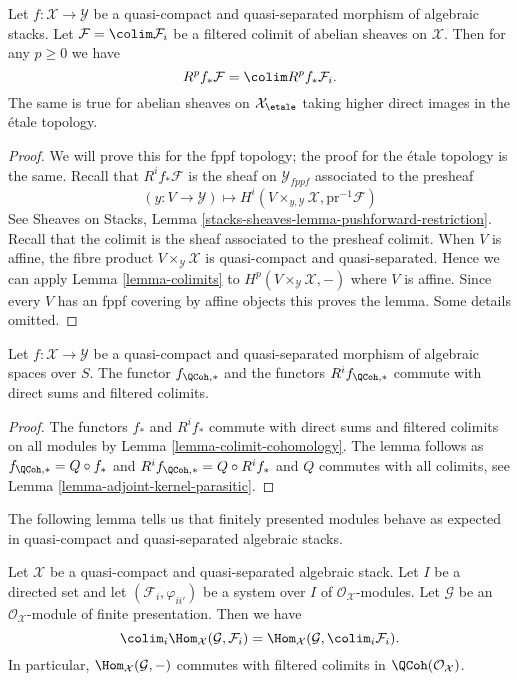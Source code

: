 \begin{lemma}
\label{lemma-colimit-cohomology}
Let $f : \mathcal{X} \to \mathcal{Y}$ be a quasi-compact and quasi-separated
morphism of algebraic stacks. Let $\mathcal{F} = \colim \mathcal{F}_i$
be a filtered colimit of abelian sheaves on $\mathcal{X}$.
Then for any $p \geq 0$ we have
$$
R^pf_*\mathcal{F} = \colim R^pf_*\mathcal{F}_i.
$$
The same is true for abelian sheaves on $\mathcal{X}_\etale$
taking higher direct images in the \'etale topology.
\end{lemma}

\begin{proof}
We will prove this for the fppf topology; the proof for the \'etale
topology is the same. Recall that $R^if_*\mathcal{F}$ is the sheaf on
$\mathcal{Y}_{fppf}$ associated to the presheaf
$$
(y : V \to \mathcal{Y})
\longmapsto
H^i(V \times_{y, \mathcal{Y}} \mathcal{X}, \text{pr}^{-1}\mathcal{F})
$$
See
Sheaves on Stacks, Lemma \ref{stacks-sheaves-lemma-pushforward-restriction}.
Recall that the colimit is the sheaf associated to the presheaf colimit.
When $V$ is affine, the fibre product $V \times_\mathcal{Y} \mathcal{X}$
is quasi-compact and quasi-separated. Hence we can apply
Lemma \ref{lemma-colimits} to $H^p(V \times_\mathcal{Y} \mathcal{X}, -)$
where $V$ is affine. Since every $V$ has an fppf covering by
affine objects this proves the lemma. Some details omitted.
\end{proof}

\begin{lemma}
\label{lemma-quasi-coherent-pushforward-direct-sums}
Let $f : \mathcal{X} \to \mathcal{Y}$ be a quasi-compact and quasi-separated
morphism of algebraic spaces over $S$. The functor $f_{\QCoh, *}$
and the functors $R^if_{\QCoh, *}$ commute with direct sums
and filtered colimits.
\end{lemma}

\begin{proof}
The functors $f_*$ and $R^if_*$ commute with direct sums and filtered
colimits on all modules by Lemma \ref{lemma-colimit-cohomology}.
The lemma follows as $f_{\QCoh, *} = Q \circ f_*$ and
$R^if_{\QCoh, *} = Q \circ R^if_*$ and $Q$ commutes with
all colimits, see Lemma \ref{lemma-adjoint-kernel-parasitic}.
\end{proof}

\noindent
The following lemma tells us that finitely presented modules behave
as expected in quasi-compact and quasi-separated algebraic stacks.

\begin{lemma}
\label{lemma-finite-presentation-quasi-compact-colimit}
Let $\mathcal{X}$ be a quasi-compact and quasi-separated algebraic stack.
Let $I$ be a directed set and let $(\mathcal{F}_i, \varphi_{ii'})$ be a
system over $I$ of $\mathcal{O}_\mathcal{X}$-modules. Let $\mathcal{G}$ be an
$\mathcal{O}_\mathcal{X}$-module of finite presentation. Then we have
$$
\colim_i \Hom_\mathcal{X}(\mathcal{G}, \mathcal{F}_i)
=
\Hom_\mathcal{X}(\mathcal{G}, \colim_i \mathcal{F}_i).
$$
In particular, $\Hom_\mathcal{X}(\mathcal{G}, -)$ commutes with filtered
colimits in $\QCoh(\mathcal{O}_\mathcal{X})$.
\end{lemma}

